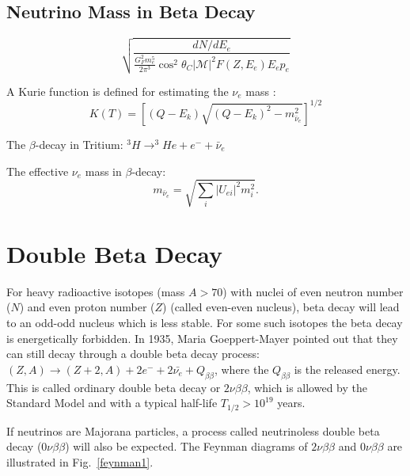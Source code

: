 \subsection{Neutrino Mass in Beta Decay}

\begin{equation}
\sqrt{\frac{dN/dE_e}{\frac{G^2_F m_e^5}{2\pi^3}\cos^2\theta_C|\mathcal{M}|^2F(Z,E_e)E_e p_e}}
\end{equation}

A Kurie function is defined for estimating the $\nu_e$ mass \cite{giunti2007fundamentals}:
\begin{equation}
K(T) =\left[(Q-E_k)\sqrt{(Q-E_k)^2-m^2_{\bar{\nu}_e}}\right]^{1/2}
\end{equation}

The $\beta$-decay in Tritium: $^3H\to^3He+e^-+\bar{\nu}_e$

The effective $\nu_e$ mass in $\beta$-decay:
\begin{equation}
m_{\bar{\nu}_e} = \sqrt{\sum_i |U_{ei}|^2 m_i^2}.
\end{equation}


\section{Double Beta Decay}

For heavy radioactive isotopes (mass $A>70$) with nuclei of even neutron number ($N$) and even proton number ($Z$) (called even-even nucleus), beta decay will lead to an odd-odd nucleus which is less stable. For some such isotopes the beta decay is energetically forbidden. In 1935, Maria Goeppert-Mayer pointed out that they can still decay through a double beta decay process: $(Z,A) \to (Z+2,A)+2e^{-}+2\bar{\nu_e}+Q_{\beta\beta}$, where the $Q_{\beta\beta}$ is the released energy. This is called ordinary double beta decay or $2\nu\beta\beta$, which is allowed by the Standard Model and with a typical half-life $T_{1/2}>10^{19}$ years\cite{povh2008particles,martin2019nuclear}.

If neutrinos are Majorana particles, a process called neutrinoless double beta decay ($0\nu\beta\beta$) will also be expected. The Feynman diagrams of $2\nu\beta\beta$ and $0\nu\beta\beta$ are illustrated in Fig.~\ref{feynman1}.


